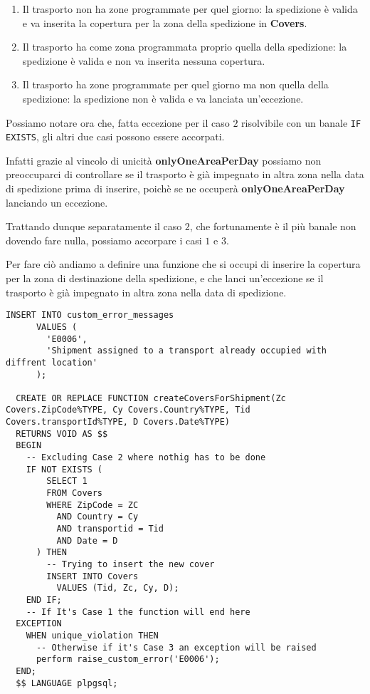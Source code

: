 \begin{enumerate}
  \item Il trasporto non ha zone programmate per quel giorno: la spedizione è valida e va inserita la copertura per la zona della spedizione in \textbf{Covers}.
  \item Il trasporto ha come zona programmata proprio quella della spedizione: la spedizione è valida e non va inserita nessuna copertura.
  \item Il trasporto ha zone programmate per quel giorno ma non quella della spedizione: la spedizione non è valida e va lanciata un'eccezione.
\end{enumerate}

Possiamo notare ora che, fatta eccezione per il caso \(2\) risolvibile con un banale \lstinline{IF EXISTS}, gli altri due casi possono essere accorpati.

Infatti grazie al vincolo di unicità \textbf{onlyOneAreaPerDay} possiamo non preoccuparci di controllare se il trasporto è già impegnato in altra zona nella data di spedizione prima di inserire, poichè se ne occuperà \textbf{onlyOneAreaPerDay} lanciando un eccezione.

Trattando dunque separatamente il caso \(2\), che fortunamente è il più banale non dovendo fare nulla, possiamo accorpare i casi \(1\) e \(3\).

Per fare ciò andiamo a definire una funzione che si occupi di inserire la copertura per la zona di destinazione della spedizione, e che lanci un'eccezione se il trasporto è già impegnato in altra zona nella data di spedizione.

\begin{lstlisting}[caption={funzione per inserimento in \textbf{Covers}}]
  INSERT INTO custom_error_messages
      VALUES (
        'E0006',
        'Shipment assigned to a transport already occupied with diffrent location'
      );
  
  CREATE OR REPLACE FUNCTION createCoversForShipment(Zc Covers.ZipCode%TYPE, Cy Covers.Country%TYPE, Tid Covers.transportId%TYPE, D Covers.Date%TYPE)
  RETURNS VOID AS $$
  BEGIN
    -- Excluding Case 2 where nothig has to be done
    IF NOT EXISTS (
        SELECT 1
        FROM Covers
        WHERE ZipCode = ZC
          AND Country = Cy
          AND transportid = Tid
          AND Date = D
      ) THEN
        -- Trying to insert the new cover
        INSERT INTO Covers
          VALUES (Tid, Zc, Cy, D);
    END IF;
    -- If It's Case 1 the function will end here
  EXCEPTION
    WHEN unique_violation THEN 
      -- Otherwise if it's Case 3 an exception will be raised
      perform raise_custom_error('E0006');
  END;
  $$ LANGUAGE plpgsql;
\end{lstlisting}

